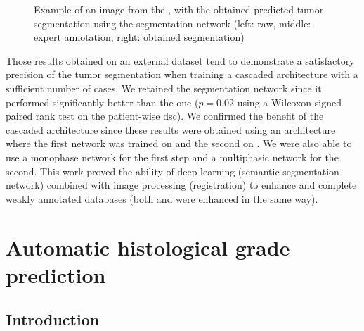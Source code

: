 \begin{figure}
\begin{minipage}{0.3\linewidth}
\end{minipage}
\caption{Example of an image from the \textbf{}, with the obtained predicted tumor
segmentation using the  segmentation network (left: raw,
middle: expert annotation, right: obtained segmentation)}
\label{fig:TCIAMultiphaseTumorPred}
\end{figure}


Those results obtained on an external dataset tend to demonstrate a satisfactory precision
of the tumor segmentation when training a cascaded architecture with a
sufficient number of cases.
We retained the  segmentation network since it performed
significantly better than the  one ($ p = 0.02 $ using a Wilcoxon signed
paired rank test on the patient-wise \ac{dsc}).
We confirmed the benefit of the cascaded architecture since these results
were obtained using an architecture where the first network was trained
on \textbf{} and the second on \textbf{}. We were also able to use
a monophase network for the first step and a multiphasic network for the
second.
This work proved the ability of deep learning (semantic segmentation
network) combined with image processing (registration) to enhance and
complete weakly annotated databases (both \textbf{} and \textbf{} were
enhanced in the same way).




\section{Automatic histological grade prediction}

\subsection{Introduction}\label{introduction}

